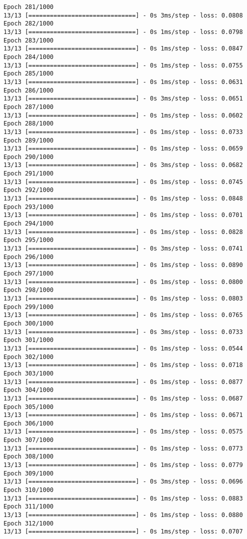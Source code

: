 \documentclass[11pt]{article}
\begin{document}
\begin{Verbatim}[commandchars=\\\{\}]
Epoch 281/1000
13/13 [==============================] - 0s 3ms/step - loss: 0.0808
Epoch 282/1000
13/13 [==============================] - 0s 1ms/step - loss: 0.0798
Epoch 283/1000
13/13 [==============================] - 0s 1ms/step - loss: 0.0847
Epoch 284/1000
13/13 [==============================] - 0s 1ms/step - loss: 0.0755
Epoch 285/1000
13/13 [==============================] - 0s 1ms/step - loss: 0.0631
Epoch 286/1000
13/13 [==============================] - 0s 3ms/step - loss: 0.0651
Epoch 287/1000
13/13 [==============================] - 0s 1ms/step - loss: 0.0602
Epoch 288/1000
13/13 [==============================] - 0s 1ms/step - loss: 0.0733
Epoch 289/1000
13/13 [==============================] - 0s 1ms/step - loss: 0.0659
Epoch 290/1000
13/13 [==============================] - 0s 3ms/step - loss: 0.0682
Epoch 291/1000
13/13 [==============================] - 0s 1ms/step - loss: 0.0745
Epoch 292/1000
13/13 [==============================] - 0s 1ms/step - loss: 0.0848
Epoch 293/1000
13/13 [==============================] - 0s 1ms/step - loss: 0.0701
Epoch 294/1000
13/13 [==============================] - 0s 1ms/step - loss: 0.0828
Epoch 295/1000
13/13 [==============================] - 0s 3ms/step - loss: 0.0741
Epoch 296/1000
13/13 [==============================] - 0s 1ms/step - loss: 0.0890
Epoch 297/1000
13/13 [==============================] - 0s 1ms/step - loss: 0.0800
Epoch 298/1000
13/13 [==============================] - 0s 1ms/step - loss: 0.0803
Epoch 299/1000
13/13 [==============================] - 0s 1ms/step - loss: 0.0765
Epoch 300/1000
13/13 [==============================] - 0s 3ms/step - loss: 0.0733
Epoch 301/1000
13/13 [==============================] - 0s 1ms/step - loss: 0.0544
Epoch 302/1000
13/13 [==============================] - 0s 1ms/step - loss: 0.0718
Epoch 303/1000
13/13 [==============================] - 0s 1ms/step - loss: 0.0877
Epoch 304/1000
13/13 [==============================] - 0s 1ms/step - loss: 0.0687
Epoch 305/1000
13/13 [==============================] - 0s 1ms/step - loss: 0.0671
Epoch 306/1000
13/13 [==============================] - 0s 1ms/step - loss: 0.0575
Epoch 307/1000
13/13 [==============================] - 0s 1ms/step - loss: 0.0773
Epoch 308/1000
13/13 [==============================] - 0s 1ms/step - loss: 0.0779
Epoch 309/1000
13/13 [==============================] - 0s 3ms/step - loss: 0.0696
Epoch 310/1000
13/13 [==============================] - 0s 1ms/step - loss: 0.0883
Epoch 311/1000
13/13 [==============================] - 0s 1ms/step - loss: 0.0880
Epoch 312/1000
13/13 [==============================] - 0s 1ms/step - loss: 0.0707

\end{Verbatim}
\end{document}
